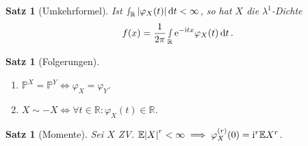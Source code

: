\documentclass[a4paper,8pt]{article}
\theoremstyle{nonumberbreak}
\newtheorem{satz}[definition]{Satz}
\renewcommand{\P}{\mathbb{P}}
\newcommand{\R}{\mathbb{R}}
\newcommand{\E}{\mathbb{E}}
\newcommand{\cf}{\varphi}
\newcommand{\e}{\mathrm{e}}
\renewcommand{\i}{\mathrm{i}}
\begin{document}
\begin{multicols}{3}
	\begin{satz}[Umkehrformel]
		Ist $\smallint_\R\abs{\cf_X(t)}\dd{t}<\infty$, so hat $X$ die
		$\lambda^1$-Dichte \[f(x) = \frac{1}{2\pi}\smallint_\R\e^{-\i tx}\cf_X(t)\dd{t}.\]
	\end{satz}
	\begin{satz}[Folgerungen]
		\begin{enumerate}[label=(\alph*)]
			\item $\P^X=\P^Y\iff\cf_X=\cf_Y$.
			\item $X\sim -X\iff \forall t\in\R:\cf_X(t)\in\R$.
		\end{enumerate}
	\end{satz}
	\begin{satz}[Momente]
		Sei $X$ ZV. $\E \abs{X}^r < \infty \implies \cf_X^{(r)}(0) = \i^r \E X^r$.
		

\end{satz}
\end{multicols}
\end{document}
